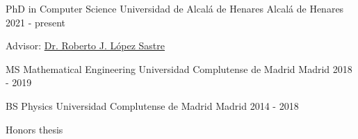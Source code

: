 

\begin{cventries}

  \cventry
    {PhD in Computer Science} %
    {Universidad de Alcalá de Henares} %
    {Alcalá de Henares} %
    {2021 - present} %
    {
      \begin{cvitems} %
        \item {Advisor: \href{https://gram.web.uah.es/people/rober/}{Dr. Roberto J. López Sastre}}
      \end{cvitems}
    }

  \cventry
    {MS Mathematical Engineering} %
    {Universidad Complutense de Madrid} %
    {Madrid} %
    {2018 - 2019} %
    {
      \begin{cvitems} %
      \end{cvitems}
    }

  \cventry
    {BS Physics} %
    {Universidad Complutense de Madrid} %
    {Madrid} %
    {2014 - 2018} %
    {
      \begin{cvitems} %
        \item {Honors thesis}
      \end{cvitems}
    }

\end{cventries}
